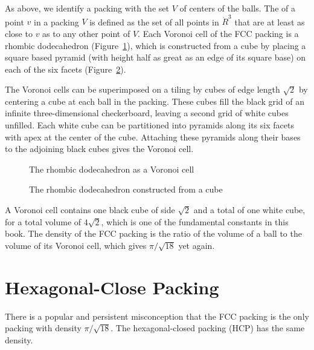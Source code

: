 As above, we identify a packing with the set $V$ of centers of the balls.
The  of a point $v$ in a packing $V$ is defined as the set of all
points in $\ring{R}^3$ 
that are at least as close to $v$ as to any other point
of $V$.  Each Voronoi cell of the FCC packing is a
rhombic dodecahedron (Figure~\ref{fig:rhombic}),  %
which is constructed from a cube by placing a
square based pyramid (with height half as great as an edge of its
square base) on each of the six facets
(Figure~\ref{fig:rhombic-cube}).  %

The Voronoi cells can be superimposed on a tiling by cubes of edge length $\sqrt2$ by
centering a cube at each ball in the packing. These
cubes fill the black grid of an infinite three-dimensional
checkerboard, leaving a second grid of white cubes unfilled.  Each
white cube can be partitioned into pyramids along its six facets with apex
at the center of the cube.  Attaching these pyramids along their bases
to the adjoining black cubes gives the Voronoi cell.

\begin{figure}[htb]
  \centering
  \caption{The rhombic dodecahedron as a Voronoi cell}
  \label{fig:rhombic}
\end{figure}

\begin{figure}[htb]
  \centering
  \caption{The rhombic dodecahedron constructed from a cube}
  \label{fig:rhombic-cube}
\end{figure}

A Voronoi cell contains one black cube of side $\sqrt2$ and a total
of one white cube, for a total volume of $4\sqrt2$, which is
one of the fundamental constants in this book.  The density of the
FCC packing is the ratio of the volume of a ball to the volume
of its Voronoi cell, which gives $\pi/\sqrt{18}$ yet again.





\section{Hexagonal-Close Packing}\label{sec:hcp}

There is a popular and persistent misconception that the FCC
 packing is the only packing with density $\pi/\sqrt{18}$.
The hexagonal-closed packing (HCP) has the same density.
%
%
%
%


